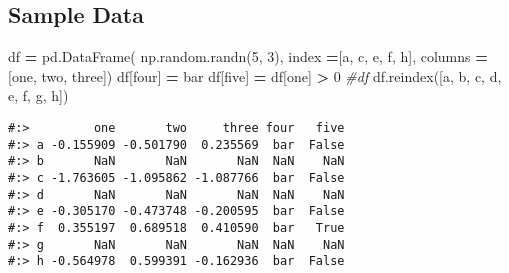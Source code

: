 \documentclass[
]{book}
\newenvironment{Shaded}{\begin{snugshade}}{\end{snugshade}}
\newcommand{\CommentTok}[1]{\textcolor[rgb]{0.37,0.37,0.37}{\textit{#1}}}
\newcommand{\DecValTok}[1]{\textcolor[rgb]{0.06,0.06,0.06}{#1}}
\newcommand{\NormalTok}[1]{#1}
\newcommand{\OperatorTok}[1]{\textcolor[rgb]{0.43,0.43,0.43}{\textbf{#1}}}
\newcommand{\StringTok}[1]{\textcolor[rgb]{0.5,0.5,0.5}{#1}}
\begin{document}
\hypertarget{sample-data-15}{%
\subsection{Sample Data}\label{sample-data-15}}

\begin{Shaded}
\begin{Highlighting}[]
\NormalTok{df }\OperatorTok{=}\NormalTok{ pd.DataFrame( np.random.randn(}\DecValTok{5}\NormalTok{, }\DecValTok{3}\NormalTok{), }
\NormalTok{                   index   }\OperatorTok{=}\NormalTok{[}\StringTok{\textquotesingle{}a\textquotesingle{}}\NormalTok{, }\StringTok{\textquotesingle{}c\textquotesingle{}}\NormalTok{, }\StringTok{\textquotesingle{}e\textquotesingle{}}\NormalTok{, }\StringTok{\textquotesingle{}f\textquotesingle{}}\NormalTok{, }\StringTok{\textquotesingle{}h\textquotesingle{}}\NormalTok{],}
\NormalTok{                   columns }\OperatorTok{=}\NormalTok{[}\StringTok{\textquotesingle{}one\textquotesingle{}}\NormalTok{, }\StringTok{\textquotesingle{}two\textquotesingle{}}\NormalTok{, }\StringTok{\textquotesingle{}three\textquotesingle{}}\NormalTok{])}
\NormalTok{df[}\StringTok{\textquotesingle{}four\textquotesingle{}}\NormalTok{] }\OperatorTok{=} \StringTok{\textquotesingle{}bar\textquotesingle{}}
\NormalTok{df[}\StringTok{\textquotesingle{}five\textquotesingle{}}\NormalTok{] }\OperatorTok{=}\NormalTok{ df[}\StringTok{\textquotesingle{}one\textquotesingle{}}\NormalTok{] }\OperatorTok{\textgreater{}} \DecValTok{0}
\CommentTok{\#df}
\NormalTok{df.reindex([}\StringTok{\textquotesingle{}a\textquotesingle{}}\NormalTok{, }\StringTok{\textquotesingle{}b\textquotesingle{}}\NormalTok{, }\StringTok{\textquotesingle{}c\textquotesingle{}}\NormalTok{, }\StringTok{\textquotesingle{}d\textquotesingle{}}\NormalTok{, }\StringTok{\textquotesingle{}e\textquotesingle{}}\NormalTok{, }\StringTok{\textquotesingle{}f\textquotesingle{}}\NormalTok{, }\StringTok{\textquotesingle{}g\textquotesingle{}}\NormalTok{, }\StringTok{\textquotesingle{}h\textquotesingle{}}\NormalTok{])}
\end{Highlighting}
\end{Shaded}

\begin{verbatim}
#:>         one       two     three four   five
#:> a -0.155909 -0.501790  0.235569  bar  False
#:> b       NaN       NaN       NaN  NaN    NaN
#:> c -1.763605 -1.095862 -1.087766  bar  False
#:> d       NaN       NaN       NaN  NaN    NaN
#:> e -0.305170 -0.473748 -0.200595  bar  False
#:> f  0.355197  0.689518  0.410590  bar   True
#:> g       NaN       NaN       NaN  NaN    NaN
#:> h -0.564978  0.599391 -0.162936  bar  False
\end{verbatim}
\end{document}

